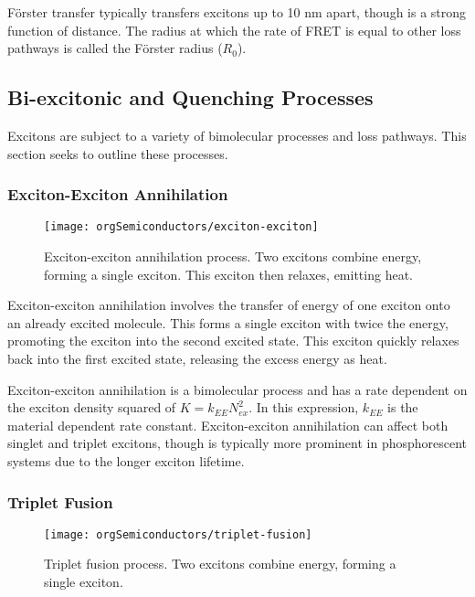 \documentclass[../thesis.tex]{subfiles}
\begin{document}
F\"{o}rster transfer typically transfers excitons up to 10 nm apart, though is a strong function of distance.
The radius at which the rate of FRET is equal to other loss pathways is called the F\"{o}rster radius ($R_0$).



\subsection{Bi-excitonic and Quenching Processes}\label{sec:orgElec_quenching}

Excitons are subject to a variety of bimolecular processes and loss pathways.  
This section seeks to outline these processes.

\subsubsection{Exciton-Exciton Annihilation}

\begin{wrapfigure}{r}{.5\textwidth}
\centering
\texttt{[image: orgSemiconductors/exciton-exciton]}
\caption{Exciton-exciton annihilation process.  Two excitons combine energy, forming a single exciton.  This exciton then relaxes, emitting heat.}
\label{fig:orgSemi_TT}
\end{wrapfigure}


Exciton-exciton annihilation involves the transfer of energy of one exciton onto an already excited molecule.  
This forms a single exciton with twice the energy, promoting the exciton into the second excited state.
This exciton quickly relaxes back into the first excited state, releasing the excess energy as heat.

Exciton-exciton annihilation is a bimolecular process and has a rate dependent on the exciton density squared of $K=k_{EE}N_{ex}^2$.\supercite{Reineke2007}
In this expression, $k_{EE}$ is the material dependent rate constant.
Exciton-exciton annihilation can affect both singlet and triplet excitons, though is typically more prominent in phosphorescent systems due to the longer exciton lifetime.


\subsubsection{Triplet Fusion}
\begin{wrapfigure}{r}{.5\textwidth}
\centering
\texttt{[image: orgSemiconductors/triplet-fusion]}
\caption{Triplet fusion process.  Two excitons combine energy, forming a single exciton.  }
\label{fig:orgSemi_TF}
\end{wrapfigure}
\end{document}
